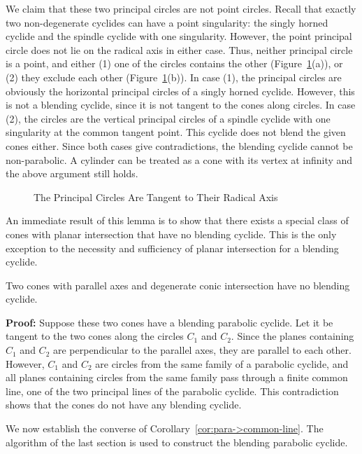      We claim that these two principal circles are not point circles.
Recall that exactly two non-degenerate cyclides can have a point singularity:
the singly horned cyclide and the spindle cyclide with one singularity.  
However, the point principal circle does not lie on the radical axis in either
case.  Thus, neither principal circle is a point, and either
(1) one of the circles contains the other (Figure~\ref{fig:all-tangent}(a)), or
(2) they exclude each other (Figure~\ref{fig:all-tangent}(b)).  In case (1),
the principal circles are obviously the horizontal principal circles of a
singly horned cyclide.  However, this is not a blending cyclide, since
it is not tangent to the cones along circles.  In case (2), the circles are
the vertical principal circles of a spindle cyclide with one singularity at
the common tangent point.  This cyclide does not blend the given
cones either.  Since both cases give contradictions, the blending cyclide
cannot be non-parabolic.  A cylinder can be treated as a cone with its vertex
at infinity and the above argument still holds. \QED
\begin{figure}
\vspace{5cm}
\caption{The Principal Circles Are Tangent to Their Radical Axis}
\label{fig:all-tangent}
\end{figure}

     An immediate result of this lemma is to show that there exists a special
class of cones with planar intersection that have no blending cyclide.  This
is the only exception to the necessity and sufficiency of planar intersection
for a blending cyclide.

\begin{corollary}
\label{cor:no-cyclide-at-all}
     Two cones with parallel axes and degenerate conic intersection 
have no blending cyclide.
\end{corollary}
{\bf Proof:}  Suppose these two cones have a blending parabolic 
cyclide.  Let it be tangent to the two cones along the circles $C_1$ and $C_2$.
Since the planes containing $C_1$ and $C_2$ are perpendicular
to the parallel axes, they are parallel to each other.
However, $C_1$ and $C_2$ are circles from the same family of a parabolic
cyclide, and all planes containing circles from the same family pass through
a finite common line, one of the two principal lines of the parabolic cyclide.
This contradiction shows that the cones do not have any blending cyclide. \QED

     We now establish the converse of Corollary~\ref{cor:para->common-line}.
The algorithm of the last section is used to construct the blending parabolic 
cyclide.

